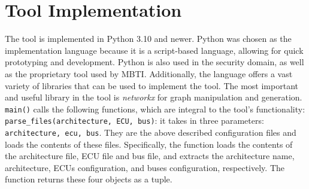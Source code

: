 \section{Tool Implementation}
\label{sec:implementation}

The tool is implemented in Python 3.10 and newer.
Python was chosen as the implementation language because it is a script-based language, allowing for quick prototyping and development.
Python is also used in the security domain, as well as the proprietary tool used by MBTI.
Additionally, the language offers a vast variety of libraries that can be used to implement the tool.
The most important and useful library in the tool is \textit{networkx} for graph manipulation and generation.\\

\texttt{main()} calls the following functions, which are integral to the tool's functionality:\\

\texttt{parse\_files(architecture, ECU, bus)}: it takes in three parameters: \texttt{architecture, ecu, bus}.
They are the above described configuration files and loads the contents of these files. 
Specifically, the function loads the contents of the architecture file, ECU file and bus file, 
and extracts the architecture name, architecture, ECUs configuration, and buses configuration, respectively. 
The function returns these four objects as a tuple.\\

